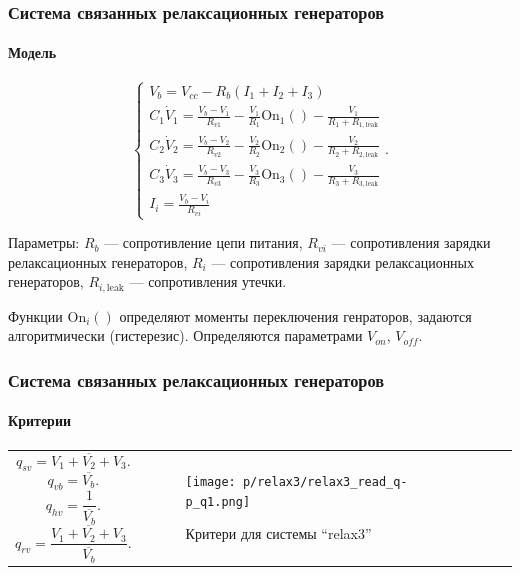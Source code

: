 \documentclass[10pt,utf8]{beamer}
\newlength\TW
\begin{document}
\begin{frame}
  \frametitle{Система связанных релаксационных генераторов}
  \framesubtitle{Модель}

  \begin{equation}
    \begin{cases}
      V_b = V_{cc} - R_b ( I_1 + I_2 + I_3 ) \\
      C_1 \dot{V}_1 = \frac{V_b-V_1}{R_{v1}} - \frac{V_1}{R_1} \mathrm{On}_1() - \frac{V_1}{R_1+R_{1,\mathrm{leak}}} \\
      C_2 \dot{V}_2 = \frac{V_b-V_2}{R_{v2}} - \frac{V_2}{R_2} \mathrm{On}_2() - \frac{V_2}{R_2+R_{2,\mathrm{leak}}} \\
      C_3 \dot{V}_3 = \frac{V_b-V_3}{R_{v3}} - \frac{V_3}{R_3} \mathrm{On}_3() - \frac{V_3}{R_3+R_{3,\mathrm{leak}}} \\
      I_i = \frac{V_b-V_i}{R_{vi}}
    \end{cases}.
    \label{atu:eq:relax3}
  \end{equation}

  Параметры:
  $R_b$ --- сопротивление цепи питания,
  $R_{vi}$ --- сопротивления зарядки релаксационных генераторов,
  $R_{i}$ --- сопротивления зарядки релаксационных генераторов,
  $R_{i,\mathrm{leak}}$ --- сопротивления утечки.

  Функции $ \mathrm{On}_i() $ определяют моменты переключения генраторов,
  задаются алгоритмически (гистерезис). Определяются параметрами
  $V_{on}$, $V_{off}$.


\end{frame}




\begin{frame}
  \frametitle{Система связанных релаксационных генераторов}
  \framesubtitle{Критерии}

  \begin{tabular}{p{40\TW}|p{57\TW}}
    \[
      q_{sv} = \overline{V_1+V_2+V_3} .
    \]
    \[
      q_{vb} = \overline{V_b} .
    \]
    \[
      q_{hv} = \frac{1}{\overline{V_b}} .
    \]
    \[
      q_{rv} = \frac{\overline{V_1+V_2+V_3}}{\overline{V_b}}.
    \]
 &
  \begin{figure}[htb!]
    \centerline{\texttt{[image: p/relax3/relax3\_read\_q-p\_q1.png]} }
    \caption{Критери для системы ``relax3''}
    \label{atu:f:relax3_q}
  \end{figure}
  \end{tabular}

\end{frame}
\end{document}
